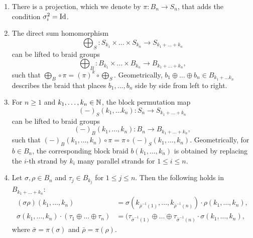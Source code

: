     \begin{rem}\label{braidfacts}
        \begin{enumerate}
            \item There is a projection, which we denote by $\pi \colon B_n \to
            S_n$, that adds the condition $\sigma_i^2 = \operatorname{Id}$.
            \item The direct sum homomorphism 
            \[
                \bigoplus_S \colon S_{k_1} \times \dots \times S_{k_n} \to S_{k_1 + \dots + k_n}
            \]
            can be lifted to braid groups
            \[
                \bigoplus_B \colon B_{k_1} \times \dots \times B_{k_n} \to B_{k_1 + \dots + k_n},
            \]
            such that $ \bigoplus_B \circ  \pi = (\pi)^k \circ \bigoplus_S$.
            Geometrically, $b_1 \oplus \dots \oplus b_n \in B_{k_1 + \dots k_n}$
            describes the braid that places $b_1, \dots, b_n$ side by side from
            left to right.
            \item For $n \geq 1$ and $k_1, \dots, k_n \in \mathbb{N}$, the block
            permutation map
            \[
                (-)_S(k_1, \dots k_n) \colon S_n \to S_{k_1 + \dots + k_n}
            \] can be lifted to braid groups
            \[
                (-)_B(k_1, \dots, k_n) \colon B_n \to B_{k_1 + \dots + k_n},
            \]
            such that $(-)_B(k_1, \dots, k_n) \circ \pi = \pi \circ (-)_S(k_1,
            \dots, k_n)$. Geometrically, for $b \in B_n$, the corresponding
            block braid $b(k_1, \dots, k_n)$ is obtained by replacing the $i$-th
            strand by $k_i$ many parallel strands for $1 \leq i \leq n$.
            \item Let $\sigma, \rho \in B_n$ and $\tau_j \in B_{k_j}$ for $1
            \leq j \leq n$. Then the following holds in $B_{k_1 + \dots + k_n}$:
            \begin{align*}
                (\sigma \rho)(k_1, \dots, k_n) &= \sigma(k_{\bar{\rho}^{-1}(1)}, \dots, k_{\bar{\rho}^{-1}(n)}) \cdot \rho(k_1, \dots, k_n), \\
                \sigma(k_1, \dots, k_n) \cdot (\tau_1 \oplus \dots \oplus \tau_n) &= (\tau_{\bar{\sigma}^{-1}(1)} \oplus \dots \oplus \tau_{\bar{\sigma}^{-1}(n)} \cdot \sigma(k_1, \dots, k_n),
            \end{align*}
            where $\bar{\sigma} = \pi(\sigma)$ and $\bar{\rho} =   \pi(\rho)$.
        \end{enumerate}
    \end{rem}
    
